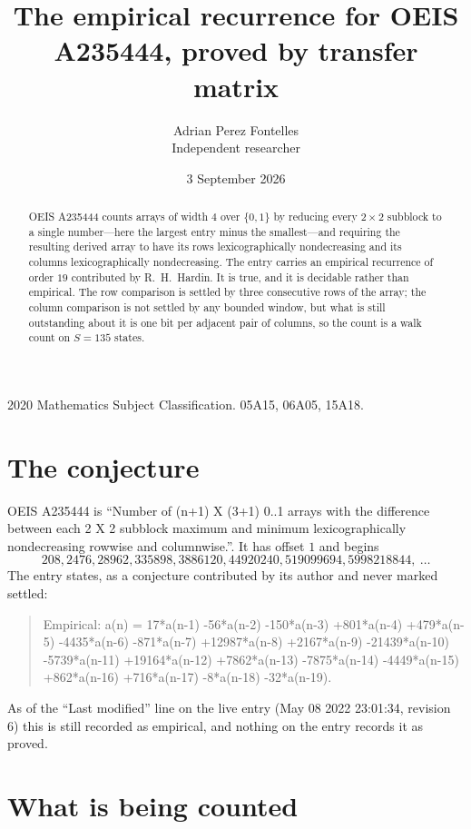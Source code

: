 \documentclass[11pt,a4paper]{article}
\title{The empirical recurrence for OEIS A235444, proved by transfer matrix}
\author{Adrian Perez Fontelles\\ \small Independent researcher}
\date{3 September 2026}
\theoremstyle{plain}
\theoremstyle{definition}
\begin{document}
\maketitle

\begin{abstract}
OEIS A235444 counts arrays of width $4$ over $\{0,1\}$ by reducing every $2\times2$ subblock to a
single number---here the largest entry minus the smallest---and requiring the resulting derived array to have its rows
lexicographically nondecreasing and its columns lexicographically nondecreasing. The entry carries an
empirical recurrence of order $19$ contributed by R.~H.~Hardin. It is true, and it is
decidable rather than empirical. The row comparison is settled by three consecutive rows of the
array; the column comparison is not settled by any bounded window, but what is still outstanding
about it is one bit per adjacent pair of columns, so the count is a walk count on $S=135$
states.
\end{abstract}

\noindent\small 2020 Mathematics Subject Classification. 05A15, 06A05, 15A18.\normalsize

\section{The conjecture}

OEIS A235444 is ``Number of (n+1) X (3+1) 0..1 arrays with the difference between each 2 X 2 subblock maximum and minimum lexicographically nondecreasing rowwise and columnwise.''. It has offset $1$ and begins
\[
208, 2476, 28962, 335898, 3886120, 44920240, 519099694, 5998218844,\ \dots
\]
The entry states, as a conjecture contributed by its author and never marked settled:
\begin{quote}
Empirical: a(n) = 17*a(n-1) -56*a(n-2) -150*a(n-3) +801*a(n-4) +479*a(n-5) -4435*a(n-6) -871*a(n-7) +12987*a(n-8) +2167*a(n-9) -21439*a(n-10) -5739*a(n-11) +19164*a(n-12) +7862*a(n-13) -7875*a(n-14) -4449*a(n-15) +862*a(n-16) +716*a(n-17) -8*a(n-18) -32*a(n-19).
\end{quote}
As of the ``Last modified'' line on the live entry (May 08 2022 23:01:34, revision 6) this is still
recorded as empirical, and nothing on the entry records it as proved.

\section{What is being counted}
\end{document}
